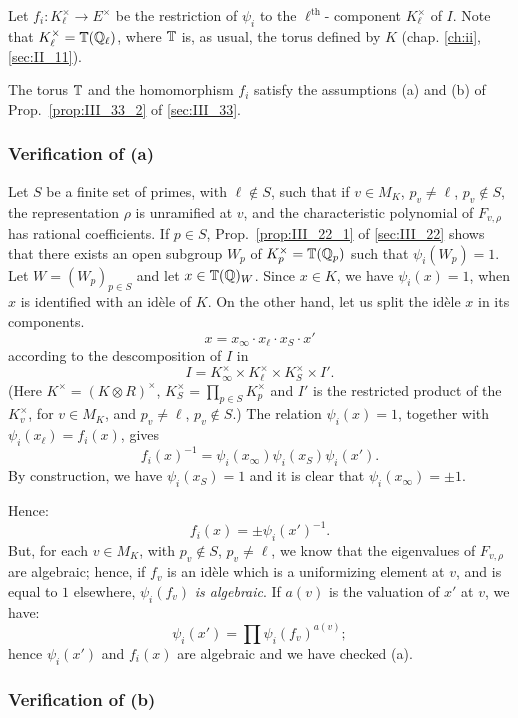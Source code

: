 Let $f_i \colon  K_\ell^\times \to E^\times$ be the restriction of $\psi_i$ to
the $\ell^{\text{th}}$- component $K^{\times}_\ell$ of $I$. Note that
$K^\times_\ell = \mathbb{T}(\mathbb{Q}_\ell)$, where $\mathbb{T}$ is, as usual, the torus defined by
$K$ (chap. \ref{ch:ii}, \ref{sec:II_11}).

\begin{lem}
The torus $\mathbb{T}$ and the homomorphism $f_i$ satisfy the assumptions (a) and (b)
of Prop.~\ref{prop:III_33_2} of \ref{sec:III_33}. 
\end{lem}

\subsubsection*{Verification of (a)}

Let $S$ be a finite set of primes, with $\ell \not\in S$, such that if $v \in
M_K$, $p_v \neq \ell$, $p_v \not\in S$, the representation $\rho$ is unramified
at $v$, and the characteristic polynomial of $F_{v,\rho}$ has rational
coefficients. If $p \in S$, Prop.~\ref{prop:III_22_1} of \ref{sec:III_22} shows
that there exists an open subgroup
$W_p$ of $K_p^\times = \mathbb{T}(\mathbb{Q}_p)$ such that $\psi_i(W_p) = 1$. Let $W =
(W_p)_{p \in S}$ and let $x \in \mathbb{T}(\mathbb{Q})_W$. Since $x \in K$, we have $\psi_i(x)
= 1$, when $x$ is identified with an idèle of $K$. On the other hand, let us
split the idèle $x$ in its components.
\[
	x = x_\infty \cdot x_\ell \cdot x_S \cdot x'
\]
\dpage
according to the descomposition of $I$ in
\[
	I = K_\infty^\times \times K_\ell^\times \times K_S^\times \times I'.
\]
(Here $K^\times = (K \otimes R)^\times$, $K_S^\times = \prod_{p \in S}
K^\times_p$ and $I'$ is the restricted product of the $K_v^\times$, for $v \in
M_K$, and $p_v \neq \ell$, $p_v \not\in S$.) The relation $\psi_i(x)=1$,
together with $\psi_i(x_\ell) = f_i(x)$, gives
\[
	f_i(x)^{-1} = \psi_i(x_\infty) \psi_i(x_S) \psi_i(x').
\]
By construction, we have $\psi_i(x_S) = 1$ and it is clear that
$\psi_i(x_\infty) = \pm 1$.

Hence:
\[
	f_i(x) = \pm \psi_i(x')^{-1}.
\]
But, for each $v \in M_K$, with $p_v \not\in S$, $p_v \neq \ell$, we know that
the eigenvalues of $F_{v,\rho}$ are algebraic; hence, if $f_v$ is an idèle which
is a uniformizing element at $v$, and is equal to $1$ elsewhere, $\psi_i(f_v)$
\emph{is algebraic}. If $a(v)$ is the valuation of $x'$ at $v$, we have:
\[
	\psi_i(x') = \prod \psi_i(f_v)^{a(v)};
\]
hence $\psi_i(x')$ and $f_i(x)$ are algebraic and we have checked (a).

\subsubsection*{Verification of (b)}

